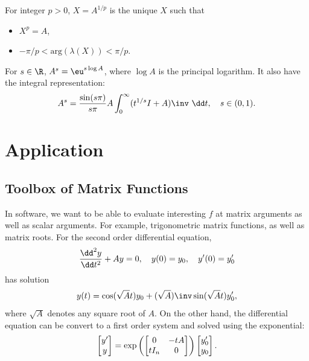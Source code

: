 \documentclass{article}
\begin{document}
\begin{definition}
     For integer $p > 0$, $X = A^{1/p}$ is the
    unique $X$ such that 
    \begin{itemize}
        \item $X^p = A$,
        \item $-\pi/p < \mathrm{arg}(\lambda(X)) < \pi/p$.
    \end{itemize}
\end{definition}

\begin{definition}
     For $s \in \R$, $A^s = \eu^{s\log A}$, where $\log
    A$ is the principal logarithm. It also have the integral
    representation:
    \begin{equation}\notag
        A^s = \frac{\sin(s\pi)}{s\pi}A \int_0^\infty (t^{1/s}I + A)\inv~\dd t, \quad s \in (0,1).
    \end{equation}
\end{definition}

\section{Application}
\subsection{Toolbox of Matrix Functions}
In software, we want to be able to evaluate interesting $f$ at matrix
arguments as well as scalar arguments. For example, trigonometric matrix
functions, as well as matrix roots. For the second order differential
equation,
\begin{equation}\notag
    \frac{\dd^2 y}{\dd t^2} + Ay = 0,\quad y(0) = y_0, \quad y'(0) = y'_0
\end{equation}
has solution 
\begin{equation}\notag
    y(t) = \cos(\sqrt{A}t) y_0 + (\sqrt{A})\inv \sin(\sqrt{A}t)y'_0,
\end{equation}
where $\sqrt{A}$ denotes any square root of $A$. On the other hand, the
differential equation can be convert to a first order system and solved
using the exponential:
\begin{equation}\notag
    \begin{bmatrix} y' \\ y \end{bmatrix} = 
    \exp \left(
        \begin{bmatrix}
            0 & -tA \\ tI_n & 0
        \end{bmatrix}
    \right)
    \begin{bmatrix} y'_0 \\ y_0 \end{bmatrix}.
\end{equation}
\end{document}
